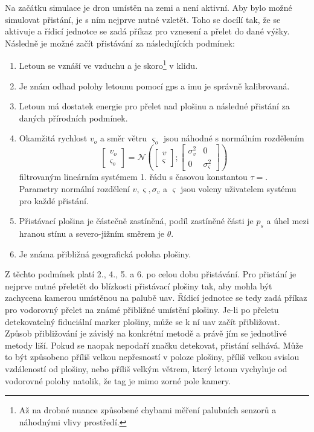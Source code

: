     Na začátku simulace je dron umístěn na zemi a není aktivní. Aby bylo možné simulovat přistání, je s ním nejprve nutné vzletět. Toho se docílí tak, že se aktivuje a řídicí jednotce se zadá příkaz pro vznesení a přelet do dané výšky. Následně je možné začít přistávání za následujících podmínek:
    \begin{enumerate}
        \item Letoun se vznáší ve vzduchu a je skoro\footnote[1]{Až na drobné nuance způsobené chybami měření palubních senzorů a náhodnými vlivy prostředí.} v klidu.
        \item Je znám odhad polohy letounu pomocí \acrshort{gps} a \acrshort{imu} je správně kalibrovaná.
        \item Letoun má dostatek energie pro přelet nad plošinu a následné přistání za daných přírodních podmínek.
        \item Okamžitá rychlost $v_o$ a směr větru $\varsigma_o$ jsou náhodné s normálním rozdělením $$\begin{bmatrix}
            v_o\\
            \varsigma_o
        \end{bmatrix} = \mathcal{N}\left(\begin{bmatrix}
            v\\
            \varsigma
        \end{bmatrix}; \begin{bmatrix}
            \sigma_v^2 & 0\\
            0          & \sigma_\varsigma^2
        \end{bmatrix}\right)$$ filtrovaným lineárním systémem 1. řádu s časovou konstantou $\tau = $. %
        Parametry normální rozdělení $v, \varsigma, \sigma_v$ a $\varsigma$ jsou voleny uživatelem systému pro každé přistání.
        \item Přistávací plošina je částečně zastíněná, podíl zastíněné části je $p_s$ a úhel mezi hranou stínu a severo-jižním směrem je $\theta$.
        \item Je známa přibližná geografická poloha plošiny.
    \end{enumerate}
    Z těchto podmínek platí 2., 4., 5. a 6. po celou dobu přistávání. Pro přistání je nejprve nutné přeletět do blízkosti přistávací plošiny tak, aby mohla být zachycena kamerou umístěnou na palubě \acrshort{uav}. Řídicí jednotce se tedy zadá příkaz pro vodorovný přelet na známé přibližné umístění plošiny. Je-li po přeletu detekovatelný fiduciální marker plošiny, může se k ní \acrshort{uav} začít přibližovat. Způsob přibližování je závislý na konkrétní metodě a právě jím se jednotlivé metody liší. Pokud se naopak nepodaří značku detekovat, přistání selhává. Může to být způsobeno příliš velkou nepřesností v poloze plošiny, příliš velkou svislou vzdáleností od plošiny, nebo příliš velkým větrem, který letoun vychyluje od vodorovné polohy natolik, že tag je mimo zorné pole kamery.

